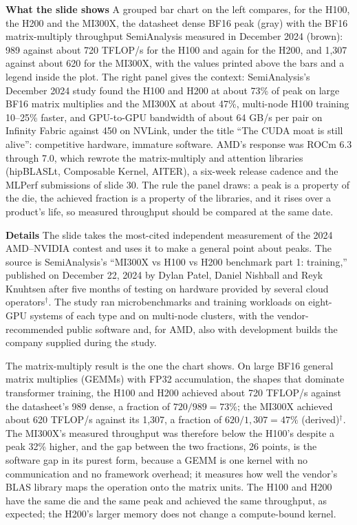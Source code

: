 \documentclass[11pt,letterpaper]{article}
\newcommand{\para}[1]{\medskip\noindent\textbf{#1}\quad}
\begin{document}
\para{What the slide shows} A grouped bar chart on the left compares, for the H100, the H200 and the MI300X, the datasheet dense BF16 peak (gray) with the BF16 matrix-multiply throughput SemiAnalysis measured in December 2024 (brown): 989 against about 720 TFLOP/s for the H100 and again for the H200, and 1{,}307 against about 620 for the MI300X, with the values printed above the bars and a legend inside the plot. The right panel gives the context: SemiAnalysis's December 2024 study found the H100 and H200 at about 73\% of peak on large BF16 matrix multiplies and the MI300X at about 47\%, multi-node H100 training 10--25\% faster, and GPU-to-GPU bandwidth of about 64 GB/s per pair on Infinity Fabric against 450 on NVLink, under the title ``The CUDA moat is still alive'': competitive hardware, immature software. AMD's response was ROCm 6.3 through 7.0, which rewrote the matrix-multiply and attention libraries (hipBLASLt, Composable Kernel, AITER), a six-week release cadence and the MLPerf submissions of slide 30. The rule the panel draws: a peak is a property of the die, the achieved fraction is a property of the libraries, and it rises over a product's life, so measured throughput should be compared at the same date.

\para{Details} The slide takes the most-cited independent measurement of the 2024 AMD--NVIDIA contest and uses it to make a general point about peaks. The source is SemiAnalysis's ``MI300X vs H100 vs H200 benchmark part 1: training,'' published on December 22, 2024 by Dylan Patel, Daniel Nishball and Reyk Knuhtsen after five months of testing on hardware provided by several cloud operators$^\dagger$. The study ran microbenchmarks and training workloads on eight-GPU systems of each type and on multi-node clusters, with the vendor-recommended public software and, for AMD, also with development builds the company supplied during the study.

The matrix-multiply result is the one the chart shows. On large BF16 general matrix multiplies (GEMMs) with FP32 accumulation, the shapes that dominate transformer training, the H100 and H200 achieved about 720 TFLOP/s against the datasheet's 989 dense, a fraction of $720/989 = 73\%$; the MI300X achieved about 620 TFLOP/s against its 1{,}307, a fraction of $620/1{,}307 = 47\%$ (derived)$^\dagger$. The MI300X's measured throughput was therefore below the H100's despite a peak 32\% higher, and the gap between the two fractions, 26 points, is the software gap in its purest form, because a GEMM is one kernel with no communication and no framework overhead; it measures how well the vendor's BLAS library maps the operation onto the matrix units. The H100 and H200 have the same die and the same peak and achieved the same throughput, as expected; the H200's larger memory does not change a compute-bound kernel.
\end{document}
